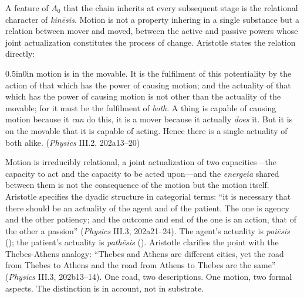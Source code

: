 A feature of $A_0$ that the chain inherits at every subsequent stage is the relational character of \textit{kinēsis}. Motion is not a property inhering in a single substance but a relation between mover and moved, between the active and passive powers whose joint actualization constitutes the process of change. Aristotle states the relation directly:
\begin{adjustwidth}{0.5in}{0in}
motion is in the movable. It is the fulfilment of this potentiality by the action of that which has the power of causing motion; and the actuality of that which has the power of causing motion is not other than the actuality of the movable; for it must be the fulfilment of \textit{both}. A thing is capable of causing motion because it \textit{can} do this, it is a mover because it actually \textit{does} it. But it is on the movable that it is capable of acting. Hence there is a single actuality of both alike. (\textit{Physics} III.2, 202a13--20)
\end{adjustwidth}
Motion is irreducibly relational, a joint actualization of two capacities---the capacity to act and the capacity to be acted upon---and the \textit{energeia} shared between them is not the consequence of the motion but the motion itself. Aristotle specifies the dyadic structure in categorial terms: ``it is necessary that there should be an actuality of the agent and of the patient. The one is agency and the other patiency; and the outcome and end of the one is an action, that of the other a passion'' (\textit{Physics} III.3, 202a21--24). The agent's actuality is \textit{poiēsis} (); the patient's actuality is \textit{pathēsis} (). Aristotle clarifies the point with the Thebes-Athens analogy: ``Thebes and Athens are different cities, yet the road from Thebes to Athens and the road from Athens to Thebes are the same'' (\textit{Physics} III.3, 202b13--14). One road, two descriptions. One motion, two formal aspects. The distinction is in account, not in substrate.

